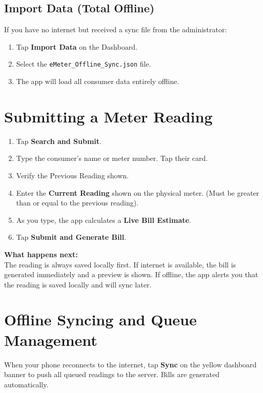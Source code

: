 \documentclass[12pt, a4paper]{report}
\begin{document}
\subsection{Import Data (Total Offline)}
If you have no internet but received a sync file from the administrator:
\begin{enumerate}
    \item Tap \textbf{Import Data} on the Dashboard.
    \item Select the \texttt{eMeter\_Offline\_Sync.json} file.
    \item The app will load all consumer data entirely offline.
\end{enumerate}

\section{Submitting a Meter Reading}

\begin{enumerate}
    \item Tap \textbf{Search and Submit}.
    \item Type the consumer's name or meter number. Tap their card.
    \item Verify the Previous Reading shown.
    \item Enter the \textbf{Current Reading} shown on the physical meter. (Must be greater than or equal to the previous reading).
    \item As you type, the app calculates a \textbf{Live Bill Estimate}.
    \item Tap \textbf{Submit and Generate Bill}.
\end{enumerate}

\begin{notebox}
\textbf{What happens next:}\\
The reading is always saved locally first. If internet is available, the bill is generated immediately and a preview is shown. If offline, the app alerts you that the reading is saved locally and will sync later.
\end{notebox}

\section{Offline Syncing and Queue Management}

When your phone reconnects to the internet, tap \textbf{Sync} on the yellow dashboard banner to push all queued readings to the server. Bills are generated automatically.
\end{document}
